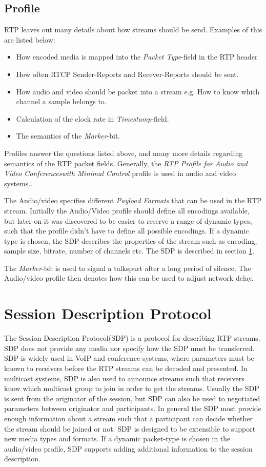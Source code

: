 \subsection{Profile} \label{sec:design:profile}
RTP leaves out many details about how streams should be send.
Examples of this are listed below:
\begin{itemize}
	\item How encoded media is mapped into the \textit{Packet Type}-field in the RTP header
	\item How often RTCP Sender-Reports and Recever-Reports should be sent.
	\item How audio and video should be packet into a stream e.g. How to know which channel a sample belongs to.
	\item Calculation of the clock rate in \textit{Timestamp}-field.
	\item The semantics of the \textit{Marker}-bit.
\end{itemize}

Profiles answer the questions listed above, and many more details regarding semantics of the RTP packet fields. Generally, the \textit{RTP Profile for Audio and Video Conferenceswith Minimal Control}\citep{RFC3551} profile is used in audio and video systems.\citep{perkins2003rtp}.

The Audio/video specifies different \textit{Payload Formats} that can be used in the RTP stream. Initially the Audio/Video profile should define all encodings available, but later on it was discovered to be easier to reserve a range of dynamic types, such that the profile didn't have to define all possible encodings. If a dynamic type is chosen, the SDP describes the properties of the stream such as encoding, sample size, bitrate, number of channels etc. The SDP is described in section \ref{sec:design:sdp}.

The \textit{Marker}-bit is used to signal a talkspurt after a long period of silence. The Audio/video profile then denotes how this can be used to adjust network delay.

\section{Session Description Protocol} \label{sec:design:sdp}
The Session Description Protocol(SDP) is a protocol for describing RTP streams.
SDP does not provide any media nor specify how the SDP must be transferred.
SDP is widely used in VoIP and conference systems, where parameters must be known to receivers before the RTP streams can be decoded and presented. In multicast systems, SDP is also used to announce streams such that receivers know which multicast group to join in order to get the streams. Usually the SDP is sent from the originator of the session, but SDP can also be used to negotiated parameters between originator and participants. In general the SDP most provide enough information about a stream such that a participant can decide whether the stream should be joined or not.  SDP is designed to be extensible to support new media types and formats. If a dynamic packet-type is chosen in the audio/video profile, SDP supports adding additional information to the session description. 

